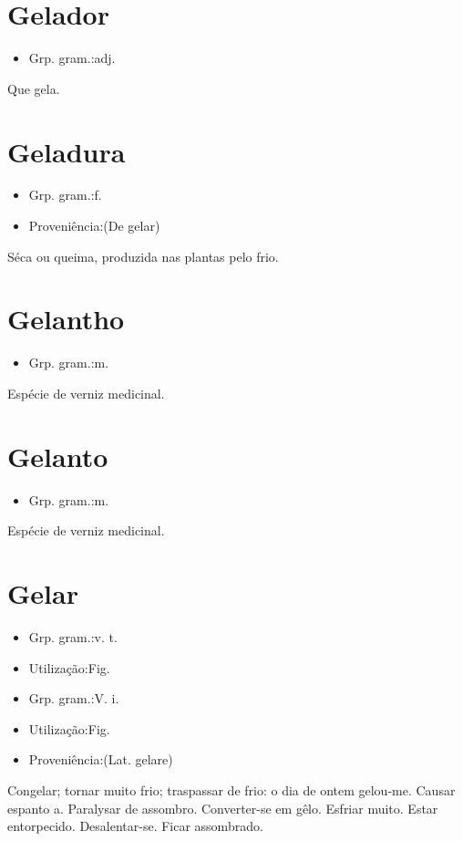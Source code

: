 \section{Gelador}
\begin{itemize}
\item {Grp. gram.:adj.}
\end{itemize}
Que gela.
\section{Geladura}
\begin{itemize}
\item {Grp. gram.:f.}
\end{itemize}
\begin{itemize}
\item {Proveniência:(De \textunderscore gelar\textunderscore )}
\end{itemize}
Séca ou queima, produzida nas plantas pelo frio.
\section{Gelantho}
\begin{itemize}
\item {Grp. gram.:m.}
\end{itemize}
Espécie de verniz medicinal.
\section{Gelanto}
\begin{itemize}
\item {Grp. gram.:m.}
\end{itemize}
Espécie de verniz medicinal.
\section{Gelar}
\begin{itemize}
\item {Grp. gram.:v. t.}
\end{itemize}
\begin{itemize}
\item {Utilização:Fig.}
\end{itemize}
\begin{itemize}
\item {Grp. gram.:V. i.}
\end{itemize}
\begin{itemize}
\item {Utilização:Fig.}
\end{itemize}
\begin{itemize}
\item {Proveniência:(Lat. \textunderscore gelare\textunderscore )}
\end{itemize}
Congelar; tornar muito frio; traspassar de frio: \textunderscore o dia de ontem gelou-me\textunderscore .
Causar espanto a.
Paralysar de assombro.
Converter-se em gêlo.
Esfriar muito.
Estar entorpecido.
Desalentar-se.
Ficar assombrado.
